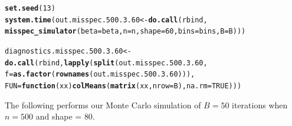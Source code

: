 \documentclass[11pt]{article}\usepackage[]{graphicx}\usepackage[]{color}
\makeatletter
\newcommand{\hlnum}[1]{\textcolor[rgb]{0.686,0.059,0.569}{#1}}%
\newcommand{\hlstd}[1]{\textcolor[rgb]{0.345,0.345,0.345}{#1}}%
\newcommand{\hlkwa}[1]{\textcolor[rgb]{0.161,0.373,0.58}{\textbf{#1}}}%
\newcommand{\hlkwb}[1]{\textcolor[rgb]{0.69,0.353,0.396}{#1}}%
\newcommand{\hlkwc}[1]{\textcolor[rgb]{0.333,0.667,0.333}{#1}}%
\newcommand{\hlkwd}[1]{\textcolor[rgb]{0.737,0.353,0.396}{\textbf{#1}}}%
\newenvironment{kframe}{%
 \def\at@end@of@kframe{}%
 \ifinner\ifhmode%
  \def\at@end@of@kframe{\end{minipage}}%
  \begin{minipage}{\columnwidth}%
 \fi\fi%
 \def\FrameCommand##1{\hskip\@totalleftmargin \hskip-\fboxsep
 \colorbox{shadecolor}{##1}\hskip-\fboxsep
     \hskip-\linewidth \hskip-\@totalleftmargin \hskip\columnwidth}%
 \MakeFramed {\advance\hsize-\width
   \@totalleftmargin\z@ \linewidth\hsize
   \@setminipage}}%
 {\par\unskip\endMakeFramed%
 \at@end@of@kframe}
\newenvironment{knitrout}{}{} %
\makeatother
\begin{document}
\begin{knitrout}
\color{fgcolor}\begin{kframe}
\begin{alltt}
\hlkwd{set.seed}\hlstd{(}\hlnum{13}\hlstd{)}
\hlkwd{system.time}\hlstd{(out.misspec.500.3.60} \hlkwb{<-} \hlkwd{do.call}\hlstd{(rbind,}
  \hlkwd{misspec_simulator}\hlstd{(}\hlkwc{beta} \hlstd{= beta,} \hlkwc{n} \hlstd{= n,} \hlkwc{shape} \hlstd{=} \hlnum{60}\hlstd{,} \hlkwc{bins} \hlstd{= bins,} \hlkwc{B} \hlstd{= B)))}
\end{alltt}


{\ttfamily\noindent\bfseries\color{errorcolor}{\#\# Error in chol.default(crossprod(x) + lambda[j] * diag(v)): the leading minor of order 5 is not positive definite}}

{\ttfamily\noindent\itshape\color{messagecolor}{\#\# Timing stopped at: 0.303 0 0.302}}\begin{alltt}
\hlstd{diagnostics.misspec.500.3.60} \hlkwb{<-} \hlkwd{do.call}\hlstd{(rbind,} \hlkwd{lapply}\hlstd{(}\hlkwd{split}\hlstd{(out.misspec.500.3.60,}
  \hlkwc{f} \hlstd{=} \hlkwd{as.factor}\hlstd{(}\hlkwd{rownames}\hlstd{(out.misspec.500.3.60))),}
  \hlkwc{FUN} \hlstd{=} \hlkwa{function}\hlstd{(}\hlkwc{xx}\hlstd{)} \hlkwd{colMeans}\hlstd{(}\hlkwd{matrix}\hlstd{(xx,} \hlkwc{nrow} \hlstd{= B),} \hlkwc{na.rm} \hlstd{=} \hlnum{TRUE}\hlstd{)))}
\end{alltt}


{\ttfamily\noindent\bfseries\color{errorcolor}{\#\# Error in split(out.misspec.500.3.60, f = as.factor(rownames(out.misspec.500.3.60))): object 'out.misspec.500.3.60' not found}}\end{kframe}
\end{knitrout}


The following performs our Monte Carlo simulation of $B = 50$ iterations 
when $n = 500$ and shape = $80$.
\end{document}
